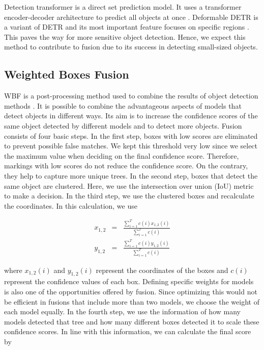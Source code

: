 \documentclass{article}
\begin{document}
Detection transformer is a direct set prediction model. It uses a transformer encoder-decoder architecture to predict all objects at once \cite{carion2020end}. Deformable DETR is a variant of DETR and its most important feature focuses on specific regions \cite{zhu2020deformable}. This paves the way for more sensitive object detection. Hence, we expect this method to contribute to fusion due to its success in detecting small-sized objects. 

\subsection{Weighted Boxes Fusion}

WBF is a post-processing method used to combine the results of object detection methods \cite{solovyev2021weighted}. It is possible to combine the advantageous aspects of models that detect objects in different ways. Its aim is to increase the confidence scores of the same object detected by different models and to detect more objects. Fusion consists of four basic steps. In the first step, boxes with low scores are eliminated to prevent possible false matches. We kept this threshold very low since we select the maximum value when deciding on the final confidence score. Therefore, markings with low scores do not reduce the confidence score. On the contrary, they help to capture more unique trees. In the second step, boxes that detect the same object are clustered. Here, we use the intersection over union (IoU) metric to make a decision. In the third step, we use the clustered boxes and recalculate the coordinates. In this calculation, we use

\begin{eqnarray}
  x_{1,2} &=& \frac{\sum_{i=1}^{T} c(i) x_{1,2}(i)}{\sum_{i=1}^{T} c(i)} \\
  y_{1,2} &=& \frac{\sum_{i=1}^{T} c(i) y_{1,2}(i)}{\sum_{i=1}^{T} c(i)}
\end{eqnarray}

\noindent where $x_{1,2}(i)$ and $y_{1,2}(i)$ represent the coordinates of the boxes and $c(i)$ represent the confidence values of each box. Defining specific weights for models is also one of the opportunities offered by fusion. Since optimizing this would not be efficient in fusions that include more than two models, we choose the weight of each model equally. In the fourth step, we use the information of how many models detected that tree and how many different boxes detected it to scale these confidence scores. In line with this information, we can calculate the final score by
\end{document}
